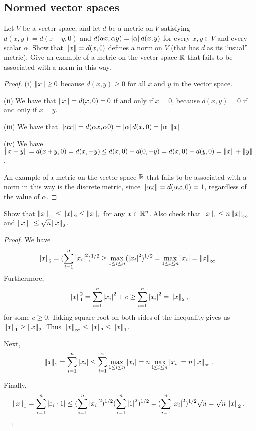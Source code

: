 \subsection{Normed vector spaces}


\begin{exercise}{16}
Let $V$ be a vector space, and let $d$ be a metric on $V$ satisfying $d(x,y)=d(x-y,0)$ and $d(\alpha x,\alpha y)=\left\lvert \alpha\right\rvert d(x,y)$ for every $x,y\in V$ and every scalar $\alpha$. Show that $\left\lVert x\right\rVert=d(x,0)$ defines a norm on $V$ (that has $d$ as its ``usual'' metric). Give an example of a metric on the vector space $\mathbb{R}$ that fails to be associated with a norm in this way.
\end{exercise}
\begin{proof}
(i) $\left\lVert x\right\rVert\geq 0$ because $d(x,y)\geq 0$ for all $x$ and $y$ in the vector space.

(ii) We have that $\left\lVert x\right\rVert=d(x,0)=0$ if and only if $x=0$, because $d(x,y)=0$ if and only if $x=y$.

(iii) We have that $\left\lVert \alpha x\right\rVert=d(\alpha x, \alpha 0) = \left\lvert \alpha\right\rvert d(x,0)=\left\lvert \alpha\right\rvert\left\lVert x\right\rVert$.

(iv) We have $\left\lVert x+y\right\rVert =d(x+y,0)=d(x,-y)\leq d(x,0)+d(0,-y) =d(x,0)+d(y,0) =\left\lVert x\right\rVert+\left\lVert y\right\rVert$.

An example of a metric on the vector space $\mathbb{R}$ that fails to be associated with a norm in this way is the discrete metric, since $\left\lVert \alpha x\right\rVert =d(\alpha x, 0) =1$, regardless of the value of $\alpha$.
\end{proof} 

\begin{exercise}{18}
Show that $\left\lVert x\right\rVert_\infty\leq \left\lVert x\right\rVert_2\leq\left\lVert x\right\rVert_1$ for any $x\in \mathbb{R}^n$. Also check that $\left\lVert x\right\rVert_1\leq n\left\lVert x\right\rVert_\infty$ and $\left\lVert x\right\rVert_1\leq\sqrt{n}\left\lVert x\right\rVert_2$.
\end{exercise}
\begin{proof}
We have 
\[
\left\lVert x\right\rVert_2 
=(\sum_{i=1}^n\left\lvert x_i\right\rvert^2)^{1/2}
\geq \max_{1\leq i\leq n}(\left\lvert x_i\right\rvert^2)^{1/2}
=\max_{1\leq i\leq n}\left\lvert x_i\right\rvert
=\left\lVert x\right\rVert_\infty.
\]
Furthermore,
\[
\left\lVert x\right\rVert_1^2
=\sum_{i=1}^n\left\lvert x_i\right\rvert^2+c
\geq \sum_{i=1}^n\left\lvert x_i\right\rvert^2
=\left\lVert x\right\rVert_2,
\]
for some $c\geq 0$. Taking square root on both sides of the inequality gives us $\left\lVert x\right\rVert_1\geq \left\lVert x\right\rVert_2$. Thus $\left\lVert x\right\rVert_\infty \leq\left\lVert x\right\rVert_2 \leq\left\lVert x\right\rVert_1$.

Next, 
\[
\left\lVert x\right\rVert_1
=\sum_{i=1}^n\left\lvert x_i\right\rvert
\leq \sum_{i=1}^n\max_{1\leq i\leq n}\left\lvert x_i\right\rvert
= n\max_{1\leq i\leq n}\left\lvert x_i\right\rvert
= n\left\lVert x\right\rVert_\infty.
\]

Finally,
\[
\left\lVert x\right\rVert_1
=\sum_{i=1}^n\left\lvert x_i\cdot 1\right\rvert
\leq (\sum_{i=1}^n\left\lvert x_i\right\rvert^2)^{1/2} (\sum_{i=1}^n\left\lvert 1\right\rvert^2)^{1/2}
= (\sum_{i=1}^n\left\lvert x_i\right\rvert^2)^{1/2}\sqrt{n}
= \sqrt{n}\left\lVert x\right\rVert_2.
\]
\end{proof} 

